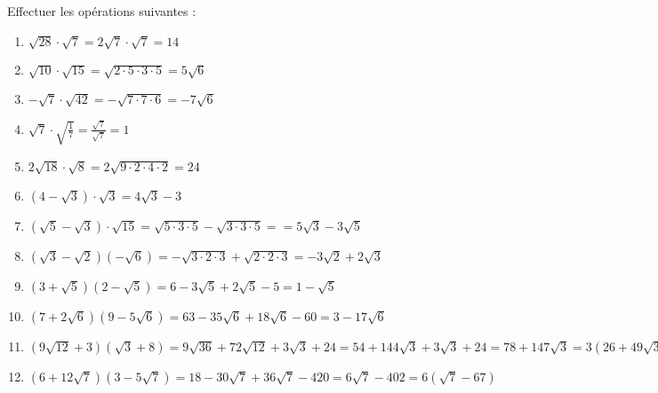 \begin{solution}
Effectuer les opérations suivantes :
\begin{enumerate}
\item $\sqrt{28}\cdot \sqrt{7}=2\sqrt{7}\cdot \sqrt{7}=14$	
\item $\sqrt{10}\cdot \sqrt{15}=\sqrt{2\cdot 5\cdot 3\cdot 5}=5\sqrt{6}$
\item $-\sqrt{7}\cdot \sqrt{42}=-\sqrt{7\cdot 7\cdot 6}=-7\sqrt{6}$
\item $\sqrt{7}\cdot \sqrt{\frac{1}{7}}=\frac{\sqrt{7}}{\sqrt{7}}=1$
\item $2\sqrt{18}\cdot \sqrt{8}=2\sqrt{9\cdot 2\cdot 4\cdot 2}=24$
\item $\left( 4-\sqrt{3} \right)\cdot \sqrt{3}=4\sqrt{3}-3$
\item $\left( \sqrt{5}-\sqrt{3} \right)\cdot \sqrt{15}=\sqrt{5\cdot 3\cdot 5}-\sqrt{3\cdot 3\cdot 5}==5\sqrt{3}-3\sqrt{5}$
\item $\left( \sqrt{3}-\sqrt{2} \right)\left( -\sqrt{6} \right)=-\sqrt{3\cdot 2\cdot 3}+\sqrt{2\cdot 2\cdot 3}=-3\sqrt{2}+2\sqrt{3}$
\item $\left( 3+\sqrt{5} \right)\left( 2-\sqrt{5} \right)=6-3\sqrt{5}+2\sqrt{5}-5=1-\sqrt{5}$
\item $\left( 7+2\sqrt{6} \right)\left( 9-5\sqrt{6} \right)=63-35\sqrt{6}+18\sqrt{6}-60=3-17\sqrt{6}$
\item $\left( 9\sqrt{12}+3 \right)\left( \sqrt{3}+8 \right)=9\sqrt{36}+72\sqrt{12}+3\sqrt{3}+24=54+144\sqrt{3}+3\sqrt{3}+24=78+147\sqrt{3}=3(26+49\sqrt{3})$\item $\left( 6+12\sqrt{7} \right)\left( 3-5\sqrt{7} \right)=18-30\sqrt{7}+36\sqrt{7}-420=6\sqrt{7}-402=6(\sqrt{7}-67)$
\end{enumerate}
\end{solution}

